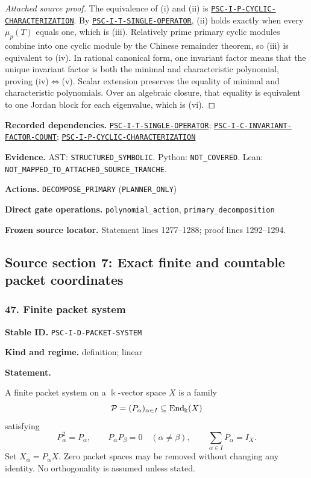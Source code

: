 \documentclass[a4paper,11pt]{article}
\newcommand{\bbk}{\Bbbk}\newcommand{\A}{\mathcal A}\newcommand{\B}{\mathcal B}\newcommand{\Ccal}{\mathcal C}\newcommand{\Pcal}{\mathcal P}\newcommand{\Qcal}{\mathcal Q}\newcommand{\Rcal}{\mathcal R}\newcommand{\Scal}{\mathcal S}
\newcommand{\field}[2]{\noindent\textbf{#1.} #2\par}
\begin{document}
\begin{proof}[Attached source proof]
The equivalence of (i) and (ii) is \hyperref[rec:PSC-I-P-CYCLIC-CHARACTERIZATION]{\nolinkurl{PSC-I-P-CYCLIC-CHARACTERIZATION}}.  By \hyperref[rec:PSC-I-T-SINGLE-OPERATOR]{\nolinkurl{PSC-I-T-SINGLE-OPERATOR}}, (ii) holds exactly when every $\mu_p(T)$ equals one, which is (iii).  Relatively prime primary cyclic modules combine into one cyclic module by the Chinese remainder theorem, so (iii) is equivalent to (iv).  In rational canonical form, one invariant factor means that the unique invariant factor is both the minimal and characteristic polynomial, proving (iv)$\Leftrightarrow$(v).  Scalar extension preserves the equality of minimal and characteristic polynomials.  Over an algebraic closure, that equality is equivalent to one Jordan block for each eigenvalue, which is (vi).
\end{proof}
\field{Recorded dependencies}{\hyperref[rec:PSC-I-T-SINGLE-OPERATOR]{\nolinkurl{PSC-I-T-SINGLE-OPERATOR}}; \hyperref[rec:PSC-I-C-INVARIANT-FACTOR-COUNT]{\nolinkurl{PSC-I-C-INVARIANT-FACTOR-COUNT}}; \hyperref[rec:PSC-I-P-CYCLIC-CHARACTERIZATION]{\nolinkurl{PSC-I-P-CYCLIC-CHARACTERIZATION}}}
\field{Evidence}{AST: \nolinkurl{STRUCTURED_SYMBOLIC}. Python: \nolinkurl{NOT_COVERED}. Lean: \nolinkurl{NOT_MAPPED_TO_ATTACHED_SOURCE_TRANCHE}.}
\field{Actions}{\nolinkurl{DECOMPOSE_PRIMARY} (\nolinkurl{PLANNER_ONLY})}
\field{Direct gate operations}{\nolinkurl{polynomial_action}, \nolinkurl{primary_decomposition}}
\field{Frozen source locator}{Statement lines 1277--1288; proof lines 1292--1294.}
\clearpage\subsection{Source section 7: Exact finite and countable packet coordinates}
\subsubsection*{47. Finite packet system}
\label{rec:PSC-I-D-PACKET-SYSTEM}
\field{Stable ID}{\nolinkurl{PSC-I-D-PACKET-SYSTEM}}
\field{Kind and regime}{definition; linear}
\textbf{Statement.}\par
A finite packet system on a $\bbk$-vector space $X$ is a family
\[
\Pcal=(P_\alpha)_{\alpha\in I}\subseteq\End_{\bbk}(X)
\]
satisfying
\[
P_\alpha^2=P_\alpha,
\qquad
P_\alpha P_\beta=0\quad(\alpha\neq\beta),
\qquad
\sum_{\alpha\in I}P_\alpha=I_X.
\]
Set $X_\alpha=P_\alpha X$.  Zero packet spaces may be removed without changing any identity.  No orthogonality is assumed unless stated.
\end{document}
